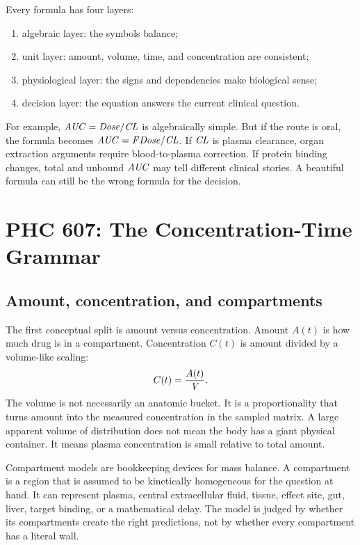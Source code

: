 \documentclass[a4paper]{article}
\newcommand{\pkCL}{\pksym{CL}}
\newcommand{\pkV}{\pksym{V}}
\newcommand{\pkF}{\pksym{F}}
\newcommand{\pkAUC}{\pksym{AUC}}
\begin{document}
Every formula has four layers:
\begin{enumerate}[leftmargin=2em]
  \item algebraic layer: the symbols balance;
  \item unit layer: amount, volume, time, and concentration are consistent;
  \item physiological layer: the signs and dependencies make biological sense;
  \item decision layer: the equation answers the current clinical question.
\end{enumerate}
For example, \(\pkAUC=\pksym{Dose}/\pkCL\) is algebraically simple. But if the route is oral, the formula becomes \(\pkAUC=\pkF\pksym{Dose}/\pkCL\). If \(\pkCL\) is plasma clearance, organ extraction arguments require blood-to-plasma correction. If protein binding changes, total and unbound \(\pkAUC\) may tell different clinical stories. A beautiful formula can still be the wrong formula for the decision.

\section{PHC 607: The Concentration-Time Grammar}

\subsection{Amount, concentration, and compartments}

The first conceptual split is amount versus concentration. Amount \(A(t)\) is how much drug is in a compartment. Concentration \(C(t)\) is amount divided by a volume-like scaling:
\[
  C(t)=\frac{A(t)}{\pkV}.
\]
The volume is not necessarily an anatomic bucket. It is a proportionality that turns amount into the measured concentration in the sampled matrix. A large apparent volume of distribution does not mean the body has a giant physical container. It means plasma concentration is small relative to total amount.

Compartment models are bookkeeping devices for mass balance. A compartment is a region that is assumed to be kinetically homogeneous for the question at hand. It can represent plasma, central extracellular fluid, tissue, effect site, gut, liver, target binding, or a mathematical delay. The model is judged by whether its compartments create the right predictions, not by whether every compartment has a literal wall.

\figureCompartmentFamily
\end{document}
